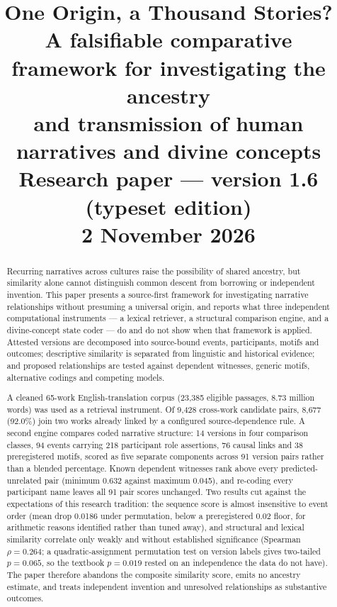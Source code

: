 \documentclass[11pt]{article}
\title{\textbf{One Origin, a Thousand Stories?}\\[4pt]
\large A falsifiable comparative framework for investigating the ancestry\\
and transmission of human narratives and divine concepts\\[10pt]
\normalsize Research paper --- version 1.6 (typeset edition)\\
2 November 2026}
\author{}
\date{}
\DeclareRobustCommand{\_}{\textunderscore\allowbreak}
\begin{document}
\maketitle
\thispagestyle{empty}

\begin{abstract}
\noindent
Recurring narratives across cultures raise the possibility of shared ancestry,
but similarity alone cannot distinguish common descent from borrowing or
independent invention. This paper presents a source-first framework for
investigating narrative relationships without presuming a universal origin, and
reports what three independent computational instruments --- a lexical
retriever, a structural comparison engine, and a divine-concept state coder ---
do and do not show when that framework is applied. Attested versions are
decomposed into source-bound events, participants, motifs and outcomes;
descriptive similarity is separated from linguistic and historical evidence; and
proposed relationships are tested against dependent witnesses, generic motifs,
alternative codings and competing models.

A cleaned 65-work English-translation corpus (23{,}385 eligible passages,
8.73 million words) was used as a retrieval instrument. Of 9{,}428 cross-work
candidate pairs, 8{,}677 (92.0\%) join two works already linked by a configured
source-dependence rule. A second engine compares coded narrative structure: 14
versions in four comparison classes, 94 events carrying 218 participant role
assertions, 76 causal links and 38 preregistered motifs, scored as five separate
components across 91 version pairs rather than a blended percentage. Known
dependent witnesses rank above every predicted-unrelated pair (minimum 0.632
against maximum 0.045), and re-coding every participant name leaves all 91 pair
scores unchanged. Two results cut against the expectations of this research
tradition: the sequence score is almost insensitive to event order (mean drop
0.0186 under permutation, below a preregistered 0.02 floor, for arithmetic
reasons identified rather than tuned away), and structural and lexical
similarity correlate only weakly and without established significance (Spearman
\(\rho = 0.264\); a quadratic-assignment permutation test on version labels
gives two-tailed \(p = 0.065\), so the textbook \(p = 0.019\) rested on an
independence the data do not have). The paper therefore abandons the composite
similarity score, emits no ancestry estimate, and treats independent invention
and unresolved relationships as substantive outcomes.


\end{abstract}
\end{document}
